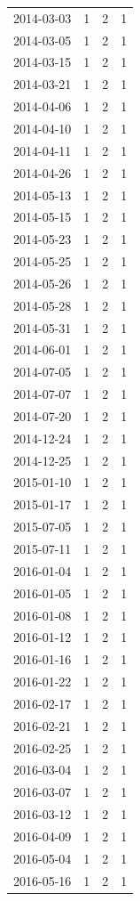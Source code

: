 \begin{tabular}{lrrr}
2014-03-03 & 1 & 2 & 1 \\
2014-03-05 & 1 & 2 & 1 \\
2014-03-15 & 1 & 2 & 1 \\
2014-03-21 & 1 & 2 & 1 \\
2014-04-06 & 1 & 2 & 1 \\
2014-04-10 & 1 & 2 & 1 \\
2014-04-11 & 1 & 2 & 1 \\
2014-04-26 & 1 & 2 & 1 \\
2014-05-13 & 1 & 2 & 1 \\
2014-05-15 & 1 & 2 & 1 \\
2014-05-23 & 1 & 2 & 1 \\
2014-05-25 & 1 & 2 & 1 \\
2014-05-26 & 1 & 2 & 1 \\
2014-05-28 & 1 & 2 & 1 \\
2014-05-31 & 1 & 2 & 1 \\
2014-06-01 & 1 & 2 & 1 \\
2014-07-05 & 1 & 2 & 1 \\
2014-07-07 & 1 & 2 & 1 \\
2014-07-20 & 1 & 2 & 1 \\
2014-12-24 & 1 & 2 & 1 \\
2014-12-25 & 1 & 2 & 1 \\
2015-01-10 & 1 & 2 & 1 \\
2015-01-17 & 1 & 2 & 1 \\
2015-07-05 & 1 & 2 & 1 \\
2015-07-11 & 1 & 2 & 1 \\
2016-01-04 & 1 & 2 & 1 \\
2016-01-05 & 1 & 2 & 1 \\
2016-01-08 & 1 & 2 & 1 \\
2016-01-12 & 1 & 2 & 1 \\
2016-01-16 & 1 & 2 & 1 \\
2016-01-22 & 1 & 2 & 1 \\
2016-02-17 & 1 & 2 & 1 \\
2016-02-21 & 1 & 2 & 1 \\
2016-02-25 & 1 & 2 & 1 \\
2016-03-04 & 1 & 2 & 1 \\
2016-03-07 & 1 & 2 & 1 \\
2016-03-12 & 1 & 2 & 1 \\
2016-04-09 & 1 & 2 & 1 \\
2016-05-04 & 1 & 2 & 1 \\
2016-05-16 & 1 & 2 & 1 \\

\end{tabular}
